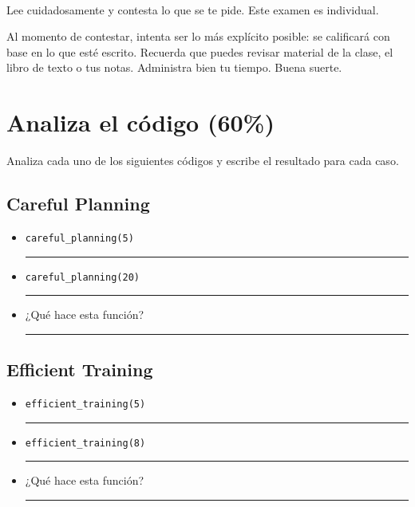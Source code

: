 \documentclass[11pt]{article}
\title{
    \myclass \\
    \textbf{\mytitle} \\
    \myheader
    \date{}
}
\newcommand{\matlab}[1]{\lstinline[style=Matlab-bw]!#1!}
\newcommand{\shortresponserule}{{\large\rule{5 cm}{0.3mm}}}
\newcommand{\responserule}{{\large\rule{10 cm}{0.3mm}}}
\begin{document}
\maketitle

\vspace{-1.5cm}

Lee cuidadosamente y contesta lo que se te pide.
Este examen es individual.

Al momento de contestar, intenta ser lo más explícito posible: se calificará con base en lo que esté escrito. %
Recuerda que puedes revisar material de la clase, el libro de texto o tus notas. %
Administra bien tu tiempo.
Buena suerte.

\section{Analiza el código (60\%)}

Analiza cada uno de los siguientes códigos y escribe el resultado para cada caso.

\subsection*{Careful Planning}



\begin{itemize}
    \item \matlab{careful_planning(5)} \hfill \shortresponserule
    \item \matlab{careful_planning(20)} \hfill \shortresponserule
    \item ¿Qué hace esta función? \hfill \responserule
\end{itemize}

\subsection*{Efficient Training}



\begin{itemize}
    \item \matlab{efficient_training(5)} \hfill \shortresponserule
    \item \matlab{efficient_training(8)} \hfill \shortresponserule
    \item ¿Qué hace esta función? \hfill \responserule
\end{itemize}
\end{document}
